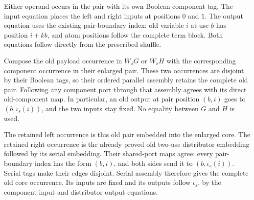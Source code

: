 Either operand occurs in the pair with its own Boolean component tag.
The input equation places the left and right inputs at positions $0$ and $1$.
The output equation uses the existing pair-boundary index: old variable $i$
at use $b$ has position $i+kb$, and atom positions follow the complete term
block. Both equations follow directly from the prescribed shuffle.

Compose the old payload occurrence in $W_sG$ or $W_sH$ with the corresponding
component occurrence in their enlarged pair. These two occurrences are
disjoint by their Boolean tags, so their ordered parallel assembly retains
the complete old pair. Following any component port through that assembly
agrees with its direct old-component map. In particular, an old output at
pair position $(b,i)$ goes to $(b,\iota_s(i))$, and the two inputs stay fixed.
No equality between $G$ and $H$ is used.

The retained left occurrence is this old pair embedded into the enlarged
core. The retained right occurrence is the already proved old two-use
distributor embedding followed by its serial embedding. Their shared-port
maps agree: every pair-boundary index has the form $(b,i)$, and both sides
send it to $(b,\iota_s(i))$. Serial tags make their edges disjoint.
Serial assembly therefore gives the complete old core occurrence. Its inputs
are fixed and its outputs follow $\iota_s$, by the component input and
distributor output equations.

